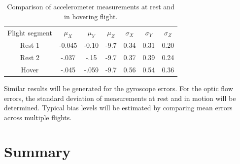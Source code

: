 \documentclass{article}
\begin{document}
\begin{table}[tb!]
\begin{tabular}{c|c|c|c|c|c|c}
Flight segment & $\mu_X$ & $\mu_Y$ & $\mu_Z$ & $\sigma_X$ & $\sigma_Y$ & $\sigma_Z$\\
Rest 1 & -0.045 & -0.10 & -9.7 & 0.34 & 0.31 &  0.20\\
Rest 2 & -.037 & -.15 & -9.7 & 0.37 & 0.39 & 0.24\\
Hover & -.045 & -.059 & -9.7 & 0.56 & 0.54 & 0.36\\
\end{tabular}
\caption{Comparison of accelerometer measurements at rest and in hovering flight.}
\label{tab:acc}
\end{table}

Similar results will be generated for the gyroscope errors. For the optic flow errors, the standard deviation of measurements at rest and in motion will be determined. Typical bias levels will be estimated by comparing mean errors across multiple flights.

\section{Summary}

\printbibliography
\end{document}
